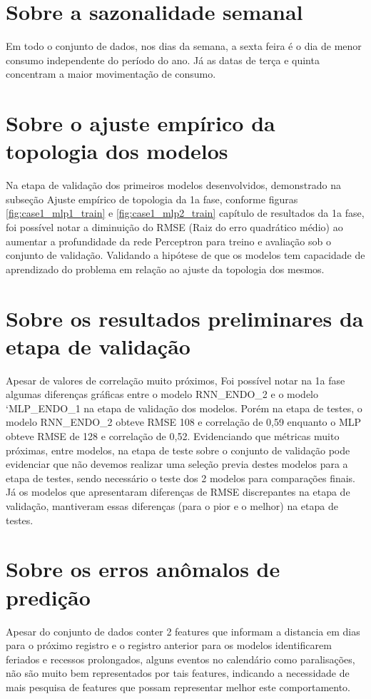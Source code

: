 \documentclass[	12pt, Times, openright, twoside, a4paper, english, brazil]{abntex2}
\begin{document}
    \section{Sobre a sazonalidade semanal}
        Em todo o conjunto de dados, nos dias da semana, a sexta feira é o dia de menor consumo independente do período do ano. Já as datas de terça e quinta concentram a maior movimentação de consumo.
    
    \section{Sobre o ajuste empírico da topologia dos modelos}
        Na etapa de validação dos primeiros modelos desenvolvidos, demonstrado na subseção Ajuste empírico de topologia da 1a fase, conforme figuras \ref{fig:case1_mlp1_train} e \ref{fig:case1_mlp2_train} capítulo de resultados da 1a fase, foi possível notar a diminuição do RMSE (Raiz do erro quadrático médio) ao aumentar a profundidade da rede Perceptron para treino e avaliação sob o conjunto de validação. Validando a hipótese de que os modelos tem capacidade de aprendizado do problema em relação ao ajuste da topologia dos mesmos.
        
    \section{Sobre os resultados preliminares da etapa de validação}
        Apesar de valores de correlação muito próximos, Foi possível notar na 1a fase algumas diferenças gráficas entre o modelo RNN\_ENDO\_2 e o modelo `MLP\_ENDO\_1 na etapa de validação dos modelos.  Porém na etapa de testes, o modelo  RNN\_ENDO\_2 obteve RMSE 108 e correlação de 0,59 enquanto o MLP obteve RMSE de 128 e correlação de 0,52. Evidenciando que métricas muito próximas, entre modelos, na etapa de teste sobre o conjunto de validação pode evidenciar que não devemos realizar uma seleção previa destes modelos para a etapa de testes, sendo necessário o teste dos 2 modelos para comparações finais. Já os modelos que apresentaram diferenças de RMSE discrepantes na etapa de validação, mantiveram essas diferenças (para o pior e o melhor) na etapa de testes.

    \section{Sobre os erros anômalos de predição}
        Apesar do conjunto de dados conter 2 features que informam a distancia em dias para o próximo registro e o registro anterior para os modelos identificarem feriados e recessos prolongados, alguns eventos no calendário como paralisações, não são muito bem representados por tais features, indicando a necessidade de mais pesquisa de features que possam representar melhor este comportamento.
\end{document}
